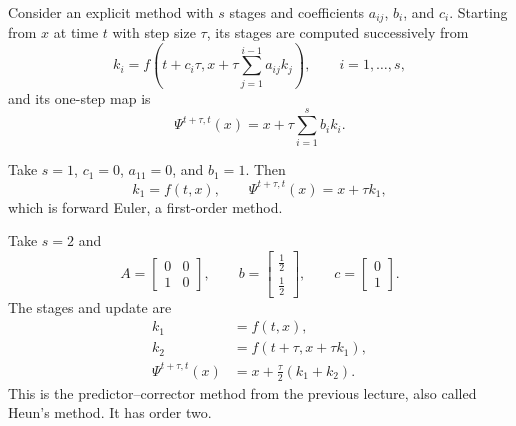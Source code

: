 Consider an explicit method with \(s\) stages and coefficients
\(a_{ij}\), \(b_i\), and \(c_i\). Starting from \(x\) at time \(t\)
with step size \(\tau\), its stages are computed successively from
\begin{equation}\label{eq:rk-stages-aug-31}
  k_i=f\left(t+c_i\tau,
    x+\tau\sum_{j=1}^{i-1}a_{ij}k_j\right),
  \qquad i=1,\ldots,s,
\end{equation}
and its one-step map is
\begin{equation}\label{eq:rk-map-aug-31}
  \Psi^{t+\tau,t}(x)
  =x+\tau\sum_{i=1}^s b_i k_i.
\end{equation}

\begin{example}
  Take \(s=1\), \(c_1=0\), \(a_{11}=0\), and \(b_1=1\). Then
  \[
    k_1=f(t,x),
    \qquad
    \Psi^{t+\tau,t}(x)=x+\tau k_1,
  \]
  which is forward Euler, a first-order method.
\end{example}

\begin{example}
  Take \(s=2\) and
  \[
    A=\begin{bmatrix}0&0\\1&0\end{bmatrix},
    \qquad
    b=\begin{bmatrix}\tfrac12\\[2pt]\tfrac12\end{bmatrix},
    \qquad
    c=\begin{bmatrix}0\\1\end{bmatrix}.
  \]
  The stages and update are
  \begin{align*}
    k_1&=f(t,x),\\
    k_2&=f(t+\tau,x+\tau k_1),\\
    \Psi^{t+\tau,t}(x)&=x+\frac{\tau}{2}(k_1+k_2).
  \end{align*}
  This is the predictor--corrector method from the previous lecture,
  also called Heun's method. It has order two.
\end{example}
